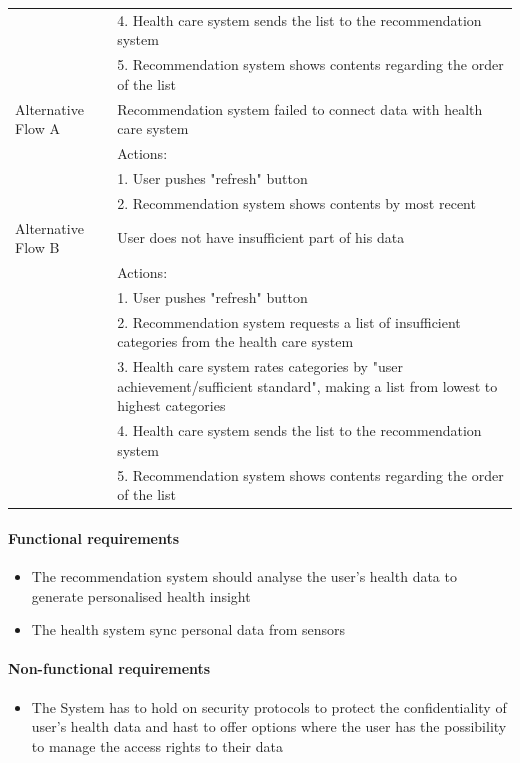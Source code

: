 \documentclass{article}
\begin{document}
\begin{table}[htbp]
\begin{tabularx}{\textwidth}{|>{\raggedright\arraybackslash}p{}|X|}
								 & 4. Health care system sends the list to the recommendation system \\
								 & 5. Recommendation system shows contents regarding the order of the list \\ \hline
				Alternative Flow A & Recommendation system failed to connect data with health care system \\
								 & Actions: \\
								 & 1. User pushes "refresh" button \\
								 & 2. Recommendation system shows contents by most recent \\ \hline
				Alternative Flow B & User does not have insufficient part of his data \\
								 & Actions: \\
								 & 1. User pushes "refresh" button \\
								 & 2. Recommendation system requests a list of insufficient categories from the health care system \\
								 & 3. Health care system rates categories by "user achievement/sufficient standard", making a list from lowest to highest categories \\
								 & 4. Health care system sends the list to the recommendation system \\
								 & 5. Recommendation system shows contents regarding the order of the list \\ \hline
			\end{tabularx}
		\end{table}
		\paragraph{Functional requirements}
		\begin{itemize}
			\item The recommendation system should analyse the user’s health data to generate personalised health insight
			\item The health system sync personal data from sensors			
		\end{itemize}
		
		\paragraph{Non-functional requirements}
		\begin{itemize}
			\item The System has to hold on security protocols to protect the confidentiality of user’s health data and hast to offer options where the user has the possibility to manage the access rights to their data
		\end{itemize}
		\newpage
		
\end{document}
